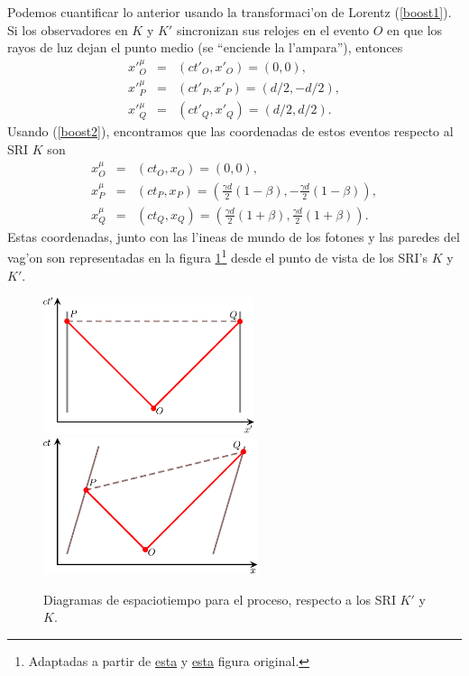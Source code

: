 Podemos cuantificar lo anterior usando la transformaci'on de Lorentz (\ref{boost1}). Si los observadores en $K$ y $K'$ sincronizan sus relojes en el evento $O$ en que los rayos de luz dejan el punto medio (se ``enciende la l'ampara''), entonces
\begin{eqnarray}
x'^\mu_O&=&(ct'_O,x'_O)=(0,0), \\
x'^\mu_P&=&(ct'_P,x'_P)=(d/2,-d/2), \\
x'^\mu_Q&=&(ct'_Q,x'_Q)=(d/2,d/2).
\end{eqnarray}
Usando (\ref{boost2}), encontramos que las coordenadas de estos eventos respecto al SRI $K$ son
\begin{eqnarray}
x^\mu_O&=&(ct_O,x_O)=(0,0), \\
x^\mu_P&=&(ct_P,x_P)=\left(\frac{\gamma d}{2}(1-\beta),-\frac{\gamma d}{2} (1-\beta)\right), \\
x^\mu_Q&=&(ct_Q,x_Q)=\left(\frac{\gamma d}{2}(1+\beta),\frac{\gamma d}{2} (1+\beta)\right).
\end{eqnarray}
Estas coordenadas, junto con las l'ineas de mundo de los fotones y las paredes del vag'on son representadas en la figura \ref{sim03-04}\footnote{Adaptadas a partir de \href{http://commons.wikimedia.org/wiki/File:TrainAndPlatformDiagram1.svg}{esta} y \href{http://commons.wikimedia.org/wiki/File:TrainAndPlatformDiagram2.svg}{esta} figura original.} desde el punto de vista de los SRI's $K$ y $K'$.
\begin{figure}[!h]
\centerline{\includegraphics[height= 4cm]{fig/fig-diagrama_simultaneidad-03.pdf}\hspace{1cm}
\includegraphics[height= 4cm]{fig/fig-diagrama_simultaneidad-04.pdf}}
\caption{Diagramas de espaciotiempo para el proceso, respecto a los SRI $K'$ y $K$.}
\label{sim03-04}
\end{figure}

